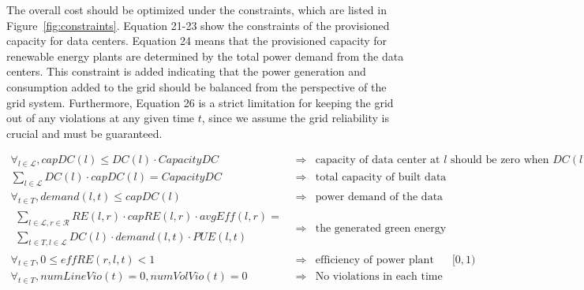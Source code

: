 The overall cost should be optimized under the constraints, which are listed in Figure~\ref{fig:constraints}. Equation 21-23 show the constraints of the provisioned capacity for data centers. Equation 24 means that the provisioned capacity for renewable energy plants are determined by the total power demand from the data centers. This constraint is added indicating that the power generation and consumption added to the grid should be balanced from the perspective of the grid system. Furthermore, Equation 26
is a strict limitation for keeping the grid out of any violations at any given time $t$, since we assume the grid reliability is crucial and must be guaranteed.

\begin{figure*} [ht]
\begin{small}
\centering
\begin{eqnarray}
\forall_{l \in \mathcal{L}}, capDC(l) \leq DC(l) \cdot CapacityDC
&\Rightarrow& \text{capacity of data center at $l$ should be zero when $DC(l)$ is 0} \\
\sum_{l\in \mathcal{L}}{DC(l)\cdot capDC(l)} = CapacityDC
&\Rightarrow& \text{total capacity of built data centers should meet the requirement} \\
\forall_{t \in T}, demand(l,t) \leq capDC(l)
&\Rightarrow& \text{power demand of the data center should not exceed its capacity} \\
\begin{split}
\sum_{l \in \mathcal{L},r \in \mathcal{R}}{ RE(l,r) \cdot capRE(l,r) \cdot avg\textit{Eff}(l,r) } = \\
\sum_{t \in T, l\in \mathcal{L}}{DC(l) \cdot demand(l,t)\cdot PUE(l,t)}
\end{split}
&\Rightarrow &\text{the generated green energy should be balanced with consumption} \\
\forall_{t \in T}, 0 \leq \textit{eff}RE(r,l,t) < 1
&\Rightarrow&  \text{efficiency of power plant should be between $[0,1)$} \\
\forall_{t \in T}, numLineVio(t)=0, numVolVio(t)=0
&\Rightarrow& \text{No violations in each time epoch}
\end{eqnarray}
\end{small}
\caption{Optimization constraints.}
\label{fig:constraints}
\end{figure*}

